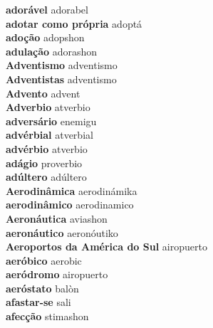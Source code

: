 \textbf{ adorável  } adorabel \\
\textbf{ adotar como própria  } adoptá \\
\textbf{ adoção  } adopshon \\
\textbf{ adulação  } adorashon \\
\textbf{ Adventismo  } adventismo \\
\textbf{ Adventistas  } adventismo \\
\textbf{ Advento  } advent \\
\textbf{ Adverbio  } atverbio \\
\textbf{ adversário  } enemigu \\
\textbf{ advérbial  } atverbial \\
\textbf{ advérbio  } atverbio \\
\textbf{ adágio  } proverbio \\
\textbf{ adúltero  } adúltero \\
\textbf{ Aerodinâmica  } aerodinámika \\
\textbf{ aerodinâmico  } aerodinamico \\
\textbf{ Aeronáutica  } aviashon \\
\textbf{ aeronáutico  } aeronóutiko \\
\textbf{ Aeroportos da América do Sul  } airopuerto \\
\textbf{ aeróbico  } aerobic \\
\textbf{ aeródromo  } airopuerto \\
\textbf{ aeróstato  } balòn \\
\textbf{ afastar-se  } sali \\
\textbf{ afecção  } stimashon \\

